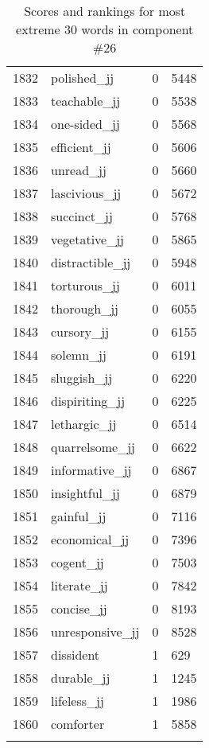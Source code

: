 \begin{longtable}[!htbp]{| rlr@{.}l |}
    1832 & polished\_jj & 0 & 5448 \\
    1833 & teachable\_jj & 0 & 5538 \\
    1834 & one-sided\_jj & 0 & 5568 \\
    1835 & efficient\_jj & 0 & 5606 \\
    1836 & unread\_jj & 0 & 5660 \\
    1837 & lascivious\_jj & 0 & 5672 \\
    1838 & succinct\_jj & 0 & 5768 \\
    1839 & vegetative\_jj & 0 & 5865 \\
    1840 & distractible\_jj & 0 & 5948 \\
    1841 & torturous\_jj & 0 & 6011 \\
    1842 & thorough\_jj & 0 & 6055 \\
    1843 & cursory\_jj & 0 & 6155 \\
    1844 & solemn\_jj & 0 & 6191 \\
    1845 & sluggish\_jj & 0 & 6220 \\
    1846 & dispiriting\_jj & 0 & 6225 \\
    1847 & lethargic\_jj & 0 & 6514 \\
    1848 & quarrelsome\_jj & 0 & 6622 \\
    1849 & informative\_jj & 0 & 6867 \\
    1850 & insightful\_jj & 0 & 6879 \\
    1851 & gainful\_jj & 0 & 7116 \\
    1852 & economical\_jj & 0 & 7396 \\
    1853 & cogent\_jj & 0 & 7503 \\
    1854 & literate\_jj & 0 & 7842 \\
    1855 & concise\_jj & 0 & 8193 \\
    1856 & unresponsive\_jj & 0 & 8528 \\
    1857 & dissident & 1 & 629 \\
    1858 & durable\_jj & 1 & 1245 \\
    1859 & lifeless\_jj & 1 & 1986 \\
    1860 & comforter & 1 & 5858 \\
    \hline
    \caption{Scores and rankings for most extreme 30 words in component \#26} \\
\end{longtable}
